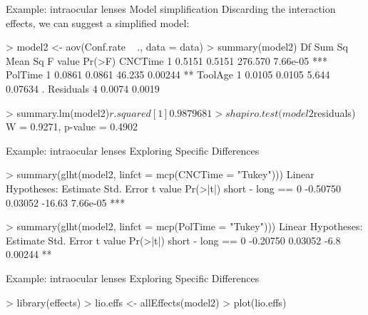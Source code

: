 \documentclass[t]{beamer}
\begin{document}

\begin{ftstf}
{Example: intraocular lenses}
{Model simplification}
Discarding the interaction effects, we can suggest a simplified model:
\begin{rcode}
> model2 <- aov(Conf.rate ~ ., data = data)
> summary(model2)
            Df Sum Sq Mean Sq F value   Pr(>F)    
CNCTime      1 0.5151  0.5151 276.570 7.66e-05 ***
PolTime      1 0.0861  0.0861  46.235  0.00244 ** 
ToolAge      1 0.0105  0.0105   5.644  0.07634 .  
Residuals    4 0.0074  0.0019                     

> summary.lm(model2)$r.squared
[1] 0.9879681

> shapiro.test(model2$residuals)
W = 0.9271, p-value = 0.4902
\end{rcode}
\end{ftstf}


\begin{ftstf}
{Example: intraocular lenses}
{Exploring Specific Differences}
\begin{rcode}
> summary(glht(model2, linfct = mcp(CNCTime = "Tukey")))
Linear Hypotheses:
                  Estimate Std. Error t value Pr(>|t|)    
short - long == 0 -0.50750    0.03052  -16.63 7.66e-05 ***

> summary(glht(model2, linfct = mcp(PolTime = "Tukey")))
Linear Hypotheses:
                  Estimate Std. Error t value Pr(>|t|)   
short - long == 0 -0.20750    0.03052    -6.8  0.00244 **
\end{rcode}
\end{ftstf}


\begin{ftstf}
{Example: intraocular lenses}
{Exploring Specific Differences}
\begin{rcode}
> library(effects)
> lio.effs <- allEffects(model2)
> plot(lio.effs)
\end{rcode}
\end{ftstf}
\end{document}
